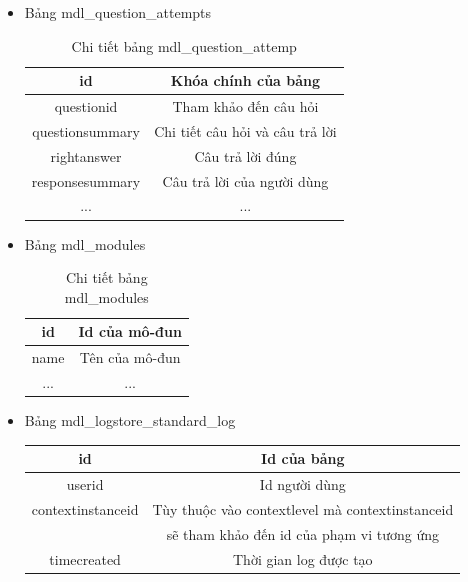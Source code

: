 \begin{itemize}
\begin{center}
\begin{table}[!htp]
			\label{bang14}
		\end{table}
	\end{center}
	\item Bảng mdl\_question\_attempts
	\begin{center}
		\begin{table}[!htp]
			\centering
			\begin{tabular}{|c|c|}
				\hline 
				id & Khóa chính của bảng \\ 
				\hline 
				questionid & Tham khảo đến câu hỏi \\ 
				\hline 
				questionsummary & Chi tiết câu hỏi và câu trả lời \\ 
				\hline 
				rightanswer & Câu trả lời đúng \\
				\hline
				responsesummary & Câu trả lời của người dùng \\
				\hline
				... & ... \\ 
				\hline 
			\end{tabular} 
			\caption{Chi tiết bảng mdl\_question\_attemp}
			\label{bang15}
		\end{table}
	\end{center}
	\newpage
	\item Bảng mdl\_modules
	\begin{center}
		\begin{table}[!htp]
			\centering
			\begin{tabular}{|c|c|}
				\hline 
				id & Id của mô-đun \\ 
				\hline 
				name & Tên của mô-đun \\ 
				\hline
				... & ... \\ 
				\hline 
			\end{tabular} 
			\caption{Chi tiết bảng mdl\_modules}
			\label{bang16}
		\end{table}
	\end{center}
	\item Bảng mdl\_logstore\_standard\_log
	\begin{center}
		\begin{table}[!htp]
			\centering
			\begin{tabular}{|c|c|}
				\hline 
				id & Id của bảng \\ 
				\hline 
				userid & Id người dùng \\ 
				\hline
				contextinstanceid & Tùy thuộc vào contextlevel mà contextinstanceid \\ & sẽ tham khảo đến id của phạm vi tương ứng \\
				\hline
				timecreated & Thời gian log được tạo \\ 

\end{tabular}
\end{table}
\end{center}
\end{itemize}

